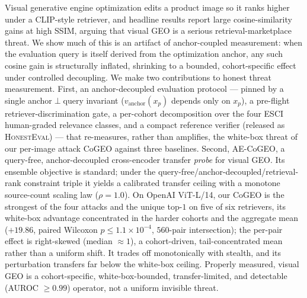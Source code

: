 Visual generative engine optimization edits a product image so it ranks higher under a CLIP-style retriever, and headline results report large cosine-similarity gains at high SSIM, arguing that visual GEO is a serious retrieval-marketplace threat. We show much of this is an artifact of anchor-coupled measurement: when the evaluation query is itself derived from the optimization anchor, any such cosine gain is structurally inflated, shrinking to a bounded, cohort-specific effect under controlled decoupling. We make two contributions to honest threat measurement. First, an anchor-decoupled evaluation protocol --- pinned by a single anchor$\perp$query invariant ($v_{\mathrm{anchor}}(x_p)$ depends only on $x_p$), a pre-flight retriever-discrimination gate, a per-cohort decomposition over the four ESCI human-graded relevance classes, and a compact reference verifier (released as \textsc{HonestEval}) --- that re-measures, rather than amplifies, the white-box threat of our per-image attack CoGEO against three baselines. Second, AE-CoGEO, a query-free, anchor-decoupled cross-encoder transfer \emph{probe} for visual GEO. Its ensemble objective is standard; under the query-free/anchor-decoupled/retrieval-rank constraint triple it yields a calibrated transfer ceiling with a monotone source-count scaling law ($\rho{=}1.0$). On OpenAI ViT-L/14, our CoGEO is the strongest of the four attacks and the unique top-$1$ on five of six retrievers, its white-box advantage concentrated in the harder cohorts and the aggregate mean ($+19.86$, paired Wilcoxon $p \leq 1.1 \times 10^{-4}$, $560$-pair intersection); the per-pair effect is right-skewed (median ${\approx}1$), a cohort-driven, tail-concentrated mean rather than a uniform shift. It trades off monotonically with stealth, and its perturbation transfers far below the white-box ceiling. Properly measured, visual GEO is a cohort-specific, white-box-bounded, transfer-limited, and detectable (AUROC $\geq 0.99$) operator, not a uniform invisible threat.
